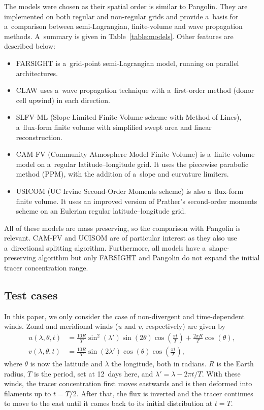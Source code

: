    The models were chosen as their spatial order is similar to
   Pangolin. They are implemented on both regular and non-regular
   grids and provide a~basis for a~comparison between semi-Lagrangian,
   finite-volume and wave propagation methods.  A~summary is given in
   Table~\ref{table:models}. Other features are described below:
\begin{itemize}
  \item FARSIGHT is a~grid-point semi-Lagrangian model, running on parallel
    architectures.
  \item CLAW uses a~wave propagation technique with a~first-order method
    (donor cell upwind) in each direction.
  \item SLFV-ML (Slope Limited Finite Volume scheme with Method of Lines), a~flux-form finite volume with simplified swept area and linear
    reconstruction.
  \item CAM-FV (Community Atmosphere Model
    Finite-Volume) is a~finite-volume model on a~regular latitude--longitude
    grid. It uses the piecewise parabolic method (PPM), with the addition of
    a~slope and curvature limiters.
  \item USICOM (UC Irvine Second-Order Moments scheme) is
    also a~flux-form finite volume. It uses an improved version of Prather's
    second-order moments scheme on an Eulerian regular
    latitude--longitude grid.
   \end{itemize}
   All of these models are mass preserving, so the comparison with
   Pangolin is relevant.  CAM-FV and UCISOM are of particular interest
   as they also use a~directional splitting algorithm. Furthermore,
   all models have a~shape-preserving algorithm but only FARSIGHT and
   Pangolin do not expand the initial tracer concentration range.


    \subsection{Test cases}
    \label{subsec:test_cases}

    In this paper, we only consider the case of non-divergent and
    time-dependent winds. Zonal and meridional winds ($u$ and $v$,
    respectively) are given by
\begin{align*}
  u(\lambda, \theta, t) &= \frac{10R}{T} \sin^2(\lambda')\sin(2\theta)\cos\left(\frac{\pi
  t}{T}\right) + \frac{2\pi R}{T}\cos(\theta), \\
  v(\lambda, \theta, t) &= \frac{10R}{T} \sin(2\lambda')\cos(\theta)\cos\left(\frac{\pi
  t}{T}\right),
   \end{align*}
   where $\theta$ is now the latitude and $\lambda$ the longitude,
   both in radians. $R$ is the Earth radius, $T$ is the period, set at 12~days here, and $\lambda'=\lambda-2\pi t/T$. With these winds, the
   tracer concentration first moves eastwards and is then deformed
   into filaments up to $t=T/2$. After that, the flux is inverted and
   the tracer continues to move to the east until it comes back to its
   initial distribution at $t=T$.

